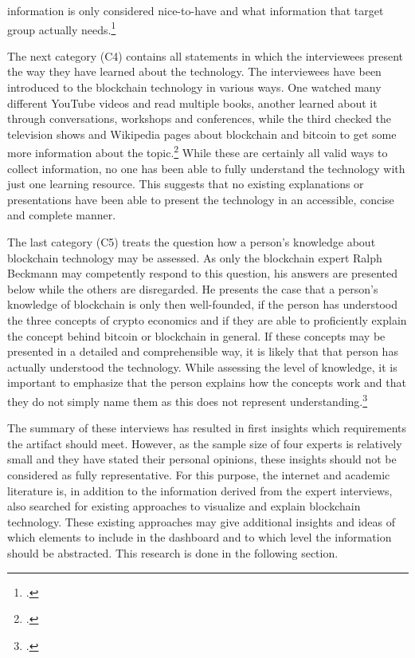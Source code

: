 information is only considered nice-to-have and what information that target group actually needs.\footcites[Cf.][P80, P81, P87]{BjoernPaulewicz_Interview}[cf.][P120]{RalphBeckmann_Interview}

The next category (C4) contains all statements in which the interviewees present the way they have learned about the technology. The interviewees have been introduced to the blockchain technology in various ways. One watched many different YouTube videos and read multiple books, another learned about it through conversations, workshops and conferences, while the third checked the television shows and Wikipedia pages about blockchain and bitcoin to get some more information about the topic.\footcites[Cf.][P6]{BjoernPaulewicz_Interview}[cf.][P72, P90]{BjoernPaulewicz_Interview}[cf.][P93, P94, P101]{RalphBeckmann_Interview} While these are certainly all valid ways to collect information, no one has been able to fully understand the technology with just one learning resource. This suggests that no existing explanations or presentations have been able to present the technology in an accessible, concise and complete manner.

The last category (C5) treats the question how a person's knowledge about blockchain technology may be assessed. As only the blockchain expert Ralph Beckmann may competently respond to this question, his answers are presented below while the others are disregarded. He presents the case that a person's knowledge of blockchain is only then well-founded, if the person has understood the three concepts of crypto economics and if they are able to proficiently explain the concept behind bitcoin or blockchain in general. If these concepts may be presented in a detailed and comprehensible way, it is likely that that person has actually understood the technology. While assessing the level of knowledge, it is important to emphasize that the person explains how the concepts work and that they do not simply name them as this does not represent understanding.\footcites[Cf.][P100, P102, P108, P111, P118, P129, P130]{RalphBeckmann_Interview}

The summary of these interviews has resulted in first insights which requirements the artifact should meet. However, as the sample size of four experts is relatively small and they have stated their personal opinions, these insights should not be considered as fully representative. For this purpose, the internet and academic literature is, in addition to the information derived from the expert interviews, also searched for existing approaches to visualize and explain blockchain technology. These existing approaches may give additional insights and ideas of which elements to include in the dashboard and to which level the information should be abstracted. This research is done in the following section.

